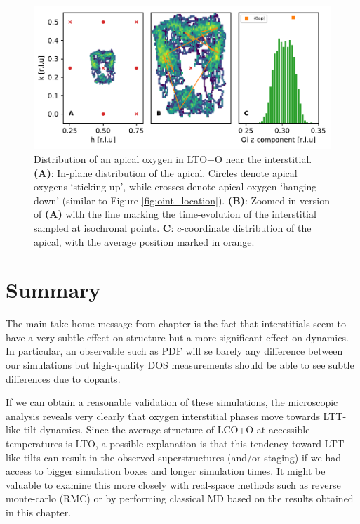 \begin{figure}
	\centering
	\includegraphics[width=\textwidth]{fig/md/diffusion2.pdf}
	\caption[MD Oint Diffusion Oap 1]{Distribution of an apical oxygen in LTO+O near the interstitial. \textbf{(A)}: In-plane distribution of the apical. Circles denote apical oxygens `sticking up', while crosses denote apical oxygen `hanging down' (similar to Figure \ref{fig:oint_location}). \textbf{(B)}: Zoomed-in version of \textbf{(A)} with the line marking the time-evolution of the interstitial sampled at isochronal points. \textbf{C}: $c$-coordinate distribution of the apical, with the average position marked in orange.}
	\label{fig:md_diffusion2}
\end{figure}

\section{Summary}
The main take-home message from chapter is the fact that interstitials seem to have a very subtle effect on structure but a more significant effect on dynamics. In particular, an observable such as PDF will se barely any difference between our simulations but high-quality DOS measurements should be able to see subtle differences due to dopants.

If we can obtain a reasonable validation of these simulations, the microscopic analysis reveals very clearly that oxygen interstitial phases move towards LTT-like tilt dynamics. Since the average structure of LCO+O at accessible temperatures is LTO, a possible explanation is that this tendency toward LTT-like tilts can result in the observed superstructures (and/or staging) \cite{Ray2017,Fratini2010} if we had access to bigger simulation boxes and longer simulation times. It might be valuable to examine this more closely with real-space methods such as reverse monte-carlo (RMC) or by performing classical MD based on the results obtained in this chapter.

